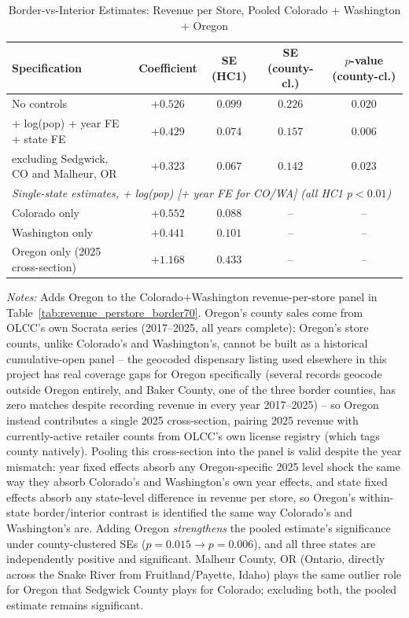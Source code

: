 \begin{table}[htbp]
\centering
\caption{Border-vs-Interior Estimates: Revenue per Store, Pooled Colorado + Washington + Oregon}
\label{tab:pooled_perstore_or}
\begin{tabular}{lcccc}
\toprule
Specification & Coefficient & SE (HC1) & SE (county-cl.) & $p$-value (county-cl.) \\
\midrule
No controls & $+0.526$ & $0.099$ & $0.226$ & $0.020$ \\
+ log(pop) + year FE + state FE & $+0.429$ & $0.074$ & $0.157$ & $0.006$ \\
\quad excluding Sedgwick, CO and Malheur, OR & $+0.323$ & $0.067$ & $0.142$ & $0.023$ \\
\midrule
\multicolumn{5}{l}{\textit{Single-state estimates, + log(pop) [+ year FE for CO/WA] (all HC1 $p<0.01$)}} \\
Colorado only & $+0.552$ & $0.088$ & -- & -- \\
Washington only & $+0.441$ & $0.101$ & -- & -- \\
Oregon only (2025 cross-section) & $+1.168$ & $0.433$ & -- & -- \\
\bottomrule
\end{tabular}
\begin{minipage}{0.95\textwidth}
\vspace{0.3em}
\footnotesize
\textit{Notes:} Adds Oregon to the Colorado+Washington revenue-per-store panel in
Table~\ref{tab:revenue_perstore_border70}. Oregon's county sales come from OLCC's own Socrata series
(2017--2025, all years complete); Oregon's store counts, unlike Colorado's and Washington's, cannot be
built as a historical cumulative-open panel -- the geocoded dispensary listing used elsewhere in this
project has real coverage gaps for Oregon specifically (several records geocode outside Oregon entirely,
and Baker County, one of the three border counties, has zero matches despite recording revenue in every
year 2017--2025) -- so Oregon instead contributes a single 2025 cross-section, pairing 2025 revenue with
currently-active retailer counts from OLCC's own license registry (which tags county natively). Pooling
this cross-section into the panel is valid despite the year mismatch: year fixed effects absorb any
Oregon-specific 2025 level shock the same way they absorb Colorado's and Washington's own year effects,
and state fixed effects absorb any state-level difference in revenue per store, so Oregon's within-state
border/interior contrast is identified the same way Colorado's and Washington's are. Adding Oregon
\emph{strengthens} the pooled estimate's significance under county-clustered SEs ($p=0.015\to p=0.006$),
and all three states are independently positive and significant. Malheur County, OR (Ontario, directly
across the Snake River from Fruitland/Payette, Idaho) plays the same outlier role for Oregon that Sedgwick
County plays for Colorado; excluding both, the pooled estimate remains significant.
\end{minipage}
\end{table}
